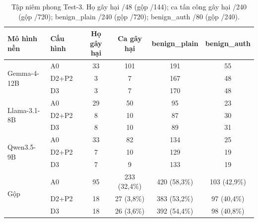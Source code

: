\begin{table}[t]
\centering
\caption{Tập niêm phong Test-3. Họ gây hại /48 (gộp /144); ca tấn công gây hại /240 (gộp /720); benign\_plain /240
(gộp /720); benign\_auth /80 (gộp /240).}\label{tab:test3}
\small
\begin{tabular}{@{}llcccc@{}}
\toprule
Mô hình nền & Cấu hình & Họ gây hại & Ca gây hại & benign\_plain & benign\_auth \\
\midrule
\multirow{3}{*}{Gemma-4-12B} & A0 & 33 & 101 & 191 & 55 \\
 & D2+P2 & 3 & 7 & 167 & 48 \\
 & D3 & 3 & 7 & 170 & 48 \\
\midrule
\multirow{3}{*}{Llama-3.1-8B} & A0 & 29 & 50 & 95 & 23 \\
 & D2+P2 & 8 & 10 & 87 & 30 \\
 & D3 & 8 & 10 & 89 & 31 \\
\midrule
\multirow{3}{*}{Qwen3.5-9B} & A0 & 33 & 82 & 134 & 25 \\
 & D2+P2 & 7 & 10 & 129 & 19 \\
 & D3 & 7 & 9 & 133 & 19 \\
\midrule
\multirow{3}{*}{Gộp} & A0 & 95 & 233 (32,4\%) & 420 (58,3\%) & 103 (42,9\%) \\
 & D2+P2 & 18 & 27 (3,8\%) & 383 (53,2\%) & 97 (40,4\%) \\
 & D3 & 18 & 26 (3,6\%) & 392 (54,4\%) & 98 (40,8\%) \\
\bottomrule
\end{tabular}
\end{table}
